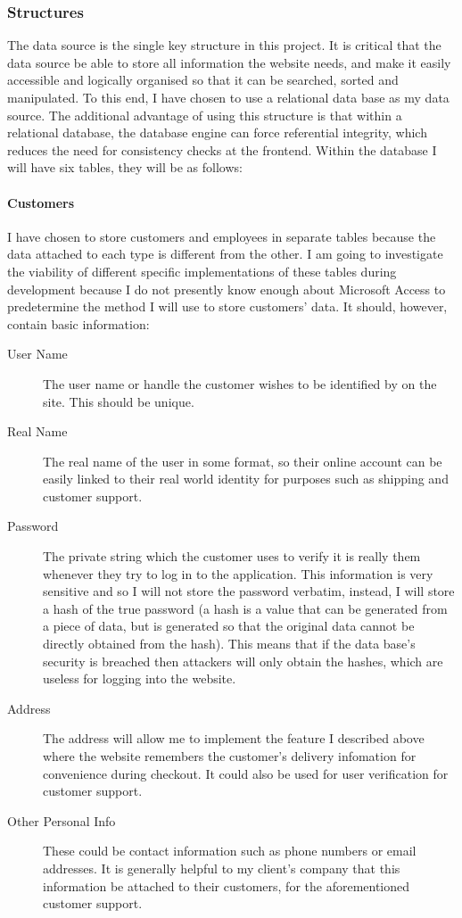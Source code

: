 ﻿\documentclass{article}
\begin{document}
    \subsubsection{Structures}
    The data source is the single key structure in this project.
    It is critical that the data source be able to store all information the website needs, and make it easily accessible and logically organised so that it can be searched, sorted and manipulated.
    To this end, I have chosen to use a relational data base as my data source.
    The additional advantage of using this structure is that within a relational database, the database engine can force referential integrity, which reduces the need for consistency checks at the frontend.
    Within the database I will have six tables, they will be as follows:
    \paragraph{Customers} I have chosen to store customers and employees in separate tables because the data attached to each type is different from the other.
    I am going to investigate the viability of different specific implementations of these tables during development because I do not presently know enough about Microsoft Access to predetermine the method I will use to store customers' data.
    It should, however, contain basic information:
    \begin{description}
        \item[User Name] The user name or handle the customer wishes to be identified by on the site.
        This should be unique.
        \item[Real Name] The real name of the user in some format, so their online account can be easily linked to their real world identity for purposes such as shipping and customer support.
        \item[Password] The private string which the customer uses to verify it is really them whenever they try to log in to the application.
        This information is very sensitive and so I will not store the password verbatim, instead, I will store a hash of the true password (a hash is a value that can be generated from a piece of data, but is generated so that the original data cannot be directly obtained from the hash).
        This means that if the data base's security is breached then attackers will only obtain the hashes, which are useless for logging into the website.
        \item[Address] The address will allow me to implement the feature I described above where the website remembers the customer's delivery infomation for convenience during checkout.
        It could also be used for user verification for customer support.
        \item[Other Personal Info] These could be contact information such as phone numbers or email addresses.
        It is generally helpful to my client's company that this information be attached to their customers, for the aforementioned customer support.
    \end{description}
\end{document}

